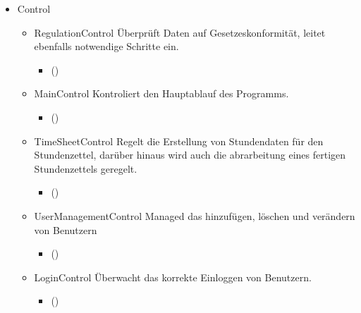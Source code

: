         \begin{itemize}
            \item{Control}
                \begin{itemize}
                    \item{RegulationControl}
                       Überprüft Daten auf Gesetzeskonformität, leitet ebenfalls notwendige Schritte ein.
                       \begin{itemize}
                           \item()
                       \end{itemize}

                    \item{MainControl}
                        Kontroliert den Hauptablauf des Programms.
                        \begin{itemize}
                             \item()
                        \end{itemize}

                    \item{TimeSheetControl}
                        Regelt die Erstellung von Stundendaten für den Stundenzettel, darüber hinaus wird auch die abrarbeitung eines fertigen Stundenzettels geregelt.
                        \begin{itemize}
                             \item()
                        \end{itemize}

                    \item{UserManagementControl}
                        Managed das hinzufügen, löschen und verändern von Benutzern
                        \begin{itemize}
                             \item()
                        \end{itemize}

                    \item{LoginControl}
                        Überwacht das korrekte Einloggen von Benutzern.
                        \begin{itemize}
                             \item()
                        \end{itemize}


\end{itemize}
\end{itemize}
